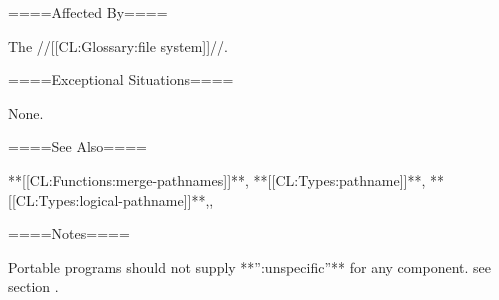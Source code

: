 ====Affected By====

The //[[CL:Glossary:file system]]//.

====Exceptional Situations====

None.

====See Also====

**[[CL:Functions:merge-pathnames]]**, **[[CL:Types:pathname]]**, **[[CL:Types:logical-pathname]]**,{\secref\FileSystemConcepts},

{\secref\PathnamesAsFilenames}

====Notes====

Portable programs should not supply **'':unspecific''** for any component. see section {\secref\UnspecificComponent}.

       
